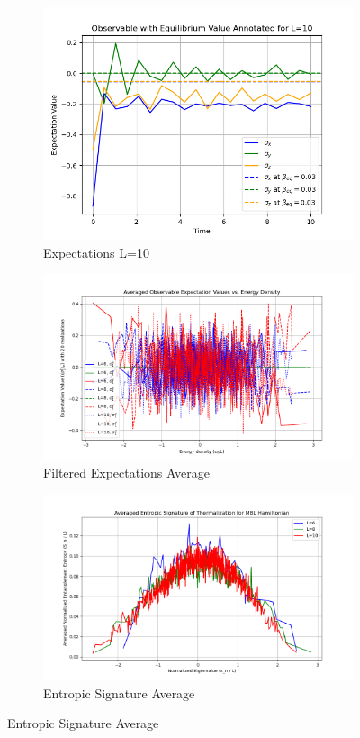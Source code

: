 \documentclass[12pt]{article}
\begin{document}
\begin{figure}[htbp]
\begin{subfigure}[b]{0.32\textwidth}
        \includegraphics[width=\textwidth]{p4_3_1_expectation_L10.png}
        \caption{Expectations L=10}
    \end{subfigure}

    \begin{subfigure}[b]{0.45\textwidth}
        \includegraphics[width=\textwidth]{p4_3_1_filtered_expectations_average.png}
        \caption{Filtered Expectations Average}
    \end{subfigure}
    \begin{subfigure}[b]{0.45\textwidth}
        \includegraphics[width=\textwidth]{p4_3_entropic_signature_average.png}
        \caption{Entropic Signature Average}
    \end{subfigure}


\end{figure}
\end{document}
